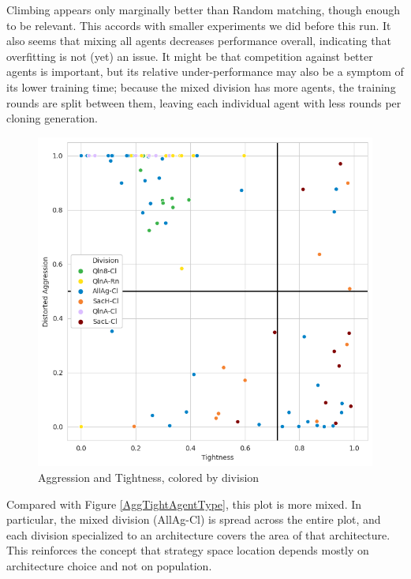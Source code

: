 Climbing appears only marginally better than Random matching, though enough to be relevant. This accords with smaller experiments we did before this run. It also seems that mixing all agents decreases performance overall, indicating that overfitting is not (yet) an issue. It might be that competition against better agents is important, but its relative under-performance may also be a symptom of its lower training time; because the mixed division has more agents, the training rounds are split between them, leaving each individual agent with less rounds per cloning generation.

\begin{figure}[H]
\centering
    \includegraphics[width=0.8\linewidth]{Results/figures/traditional_scatterplot_Division.png}
\caption{Aggression and Tightness, colored by division}
\label{AggTightDivision}
\end{figure}

Compared with Figure \ref{AggTightAgentType}, this plot is more mixed. In particular, the mixed division (AllAg-Cl) is spread across the entire plot, and each division specialized to an architecture covers the area of that architecture. This reinforces the concept that strategy space location depends mostly on architecture choice and not on population.

